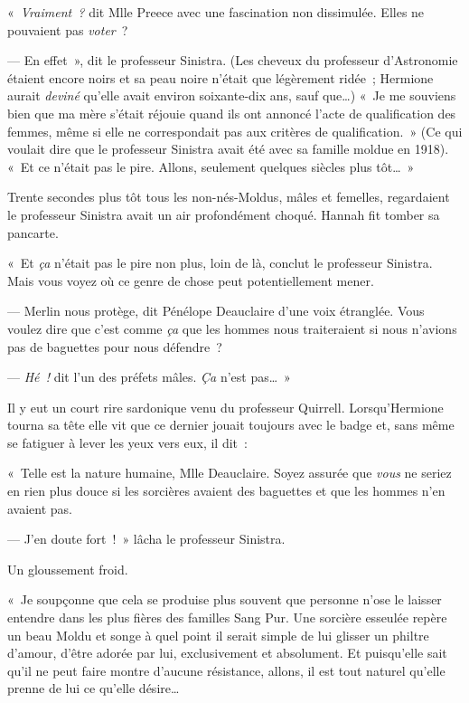 «~\emph{Vraiment~?} dit Mlle Preece avec une fascination non dissimulée.
Elles ne pouvaient pas \emph{voter}~?

--- En effet~», dit le professeur Sinistra.
(Les cheveux du professeur d'Astronomie étaient encore noirs et sa peau noire n'était que légèrement ridée~; Hermione aurait \emph{deviné} qu'elle avait environ soixante-dix ans, sauf que…) «~Je me souviens bien que ma mère s'était réjouie quand ils ont annoncé l'acte de qualification des femmes, même si elle ne correspondait pas aux critères de qualification.~»
(Ce qui voulait dire que le professeur Sinistra avait été avec sa famille moldue en 1918).
«~Et ce n'était pas le pire.
Allons, seulement quelques siècles plus tôt…~»

Trente secondes plus tôt tous les non-nés-Moldus, mâles et femelles, regardaient le professeur Sinistra avait un air profondément choqué.
Hannah fit tomber sa pancarte.

«~Et \emph{ça} n'était pas le pire non plus, loin de là, conclut le professeur Sinistra.
Mais vous voyez où ce genre de chose peut potentiellement mener.

--- Merlin nous protège, dit Pénélope Deauclaire d'une voix étranglée.
Vous voulez dire que c'est comme \emph{ça} que les hommes nous traiteraient si nous n'avions pas de baguettes pour nous défendre~?

--- \emph{Hé~!} dit l'un des préfets mâles.
\emph{Ça} n'est pas…~»

Il y eut un court rire sardonique venu du professeur Quirrell.
Lorsqu'Hermione tourna sa tête elle vit que ce dernier jouait toujours avec le badge et, sans même se fatiguer à lever les yeux vers eux, il dit~:

«~Telle est la nature humaine, Mlle Deauclaire.
Soyez assurée que \emph{vous} ne seriez en rien plus douce si les sorcières avaient des baguettes et que les hommes n'en avaient pas.

--- J'en doute fort~!~»
lâcha le professeur Sinistra.

Un gloussement froid.

«~Je soupçonne que cela se produise plus souvent que personne n'ose le laisser entendre dans les plus fières des familles Sang Pur.
Une sorcière esseulée repère un beau Moldu et songe à quel point il serait simple de lui glisser un philtre d'amour, d'être adorée par lui, exclusivement et absolument.
Et puisqu'elle sait qu'il ne peut faire montre d'aucune résistance, allons, il est tout naturel qu'elle prenne de lui ce qu'elle désire…


